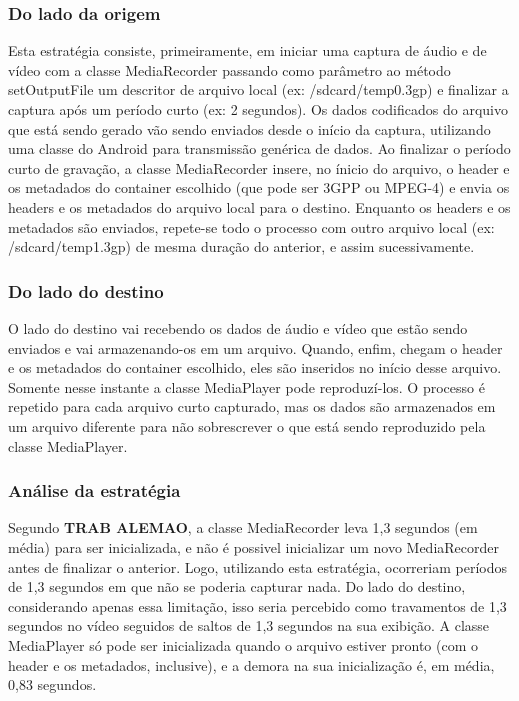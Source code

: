 \documentclass{acm_proc_article-sp}
\newcommand{\todo}[1]{\textcolor[rgb]{1.00,0.00,0.00}{\bf \uppercase{#1}}}
\begin{document}
\subsubsection{Do lado da origem}

Esta estratégia consiste, primeiramente, em iniciar uma captura de áudio e de vídeo com a classe MediaRecorder passando como parâmetro ao método setOutputFile um descritor de arquivo local (ex: /sdcard/temp0.3gp) e finalizar a captura após um período curto (ex: 2 segundos). Os dados codificados do arquivo que está sendo gerado vão sendo enviados desde o início da captura, utilizando uma classe do Android para transmissão genérica de dados. Ao finalizar o período curto de gravação, a classe MediaRecorder insere, no ínicio do arquivo, o header e os metadados do container escolhido (que pode ser 3GPP ou MPEG-4) e envia os headers e os metadados do arquivo local para o destino. Enquanto os headers e os metadados são enviados, repete-se todo o processo com outro arquivo local (ex: /sdcard/temp1.3gp) de mesma duração do anterior, e assim sucessivamente.

\subsubsection{Do lado do destino}

O lado do destino vai recebendo os dados de áudio e vídeo que estão sendo enviados e vai armazenando-os em um arquivo. Quando, enfim, chegam o header e os metadados do container escolhido, eles são inseridos no início desse arquivo. Somente nesse instante a classe MediaPlayer pode reproduzí-los. O processo é repetido para cada arquivo curto capturado, mas os dados são armazenados em um arquivo diferente para não sobrescrever o que está sendo reproduzido pela classe MediaPlayer.

\subsubsection{Análise da estratégia}

Segundo \todo{trab alemao}, a classe MediaRecorder leva 1,3 segundos (em média) para ser inicializada, e não é possivel inicializar um novo MediaRecorder antes de finalizar o anterior. Logo, utilizando esta estratégia, ocorreriam períodos de 1,3 segundos em que não se poderia capturar nada. Do lado do destino, considerando apenas essa limitação, isso seria percebido como travamentos de 1,3 segundos no vídeo seguidos de saltos de 1,3 segundos na sua exibição. A classe MediaPlayer só pode ser inicializada quando o arquivo estiver pronto (com o header e os metadados, inclusive), e a demora na sua inicialização é, em média, 0,83 segundos.
\end{document}
